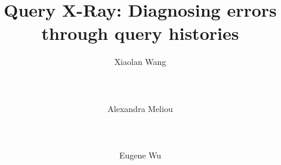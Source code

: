 



\newcommand{\alex}[1]{\noindent{\color{darkgreen}{Alexandra: #1}}}
\newcommand{\xlw}[1]{\noindent{\color{blue}{Xiaolan: #1}}}
\newcommand{\ewu}[1]{\noindent{\color{red}{EWu: #1}}}
\newcommand{\xxx}[1]{{\fontsize{13pt}{13pt}\selectfont\textcolor{red}{#1}}}
\newcommand{\codesize}{\fontsize{7}{8}}
\newcommand{\stitle}[1]{\vspace{0.5em}\noindent\textbf{#1}}
\newcommand{\calF}[0]{$\cal{F}$}

\newcommand{\ind}{\hspace{\algorithmicindent}}
\newcommand{\sys}{\textsc{QueryXRay}\xspace}

\newcommand{\deprecate}[1]{\noindent{\color{light-gray}{#1}}}

\newcommand{\prob}{{\sc Log-Corruption}\xspace}
\newcommand{\exact}{{\sc EXACTSOL}\xspace}
\newcommand{\qfix}{{\sc SingleQueryFix}\xspace}
\newcommand{\density}{{\sc DENSITY}\xspace}





\title{Query X-Ray: Diagnosing errors through query histories}


\author{
  \alignauthor Xiaolan Wang\\
    \\
    \\
    \\
  \alignauthor Alexandra Meliou\\
  \\
    \\
    \\
  \alignauthor Eugene Wu\\
    \\
    \\
    \\
}



